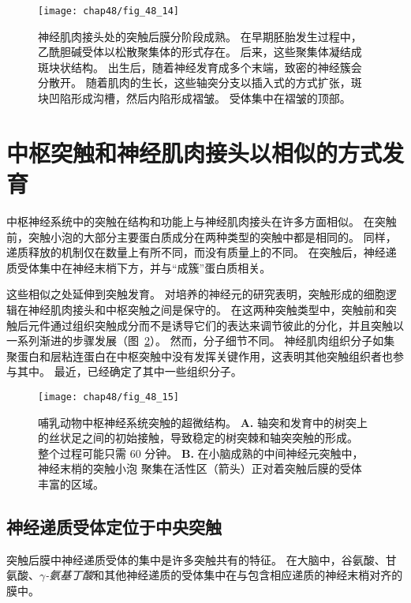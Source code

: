 \begin{figure}[htbp]
	\centering
	\texttt{[image: chap48/fig\_48\_14]}
	\caption{神经肌肉接头处的突触后膜分阶段成熟。
		在早期胚胎发生过程中，乙酰胆碱受体以松散聚集体的形式存在。
		后来，这些聚集体凝结成斑块状结构。
		出生后，随着神经发育成多个末端，致密的神经簇会分散开。
		随着肌肉的生长，这些轴突分支以插入式的方式扩张，斑块凹陷形成沟槽，然后内陷形成褶皱。
		受体集中在褶皱的顶部\cite{sanes2001induction}。}
	\label{fig:48_14}
\end{figure}



\section{中枢突触和神经肌肉接头以相似的方式发育}

中枢神经系统中的突触在结构和功能上与神经肌肉接头在许多方面相似。
在突触前，突触小泡的大部分主要蛋白质成分在两种类型的突触中都是相同的。
同样，递质释放的机制仅在数量上有所不同，而没有质量上的不同。
在突触后，神经递质受体集中在神经末梢下方，并与“成簇”蛋白质相关。


这些相似之处延伸到突触发育。
对培养的神经元的研究表明，突触形成的细胞逻辑在神经肌肉接头和中枢突触之间是保守的。
在这两种突触类型中，突触前和突触后元件通过组织突触成分而不是诱导它们的表达来调节彼此的分化，并且突触以一系列渐进的步骤发展（图~\ref{fig:48_15}）。
然而，分子细节不同。
神经肌肉组织分子如集聚蛋白和层粘连蛋白在中枢突触中没有发挥关键作用，这表明其他突触组织者也参与其中。
最近，已经确定了其中一些组织分子。


\begin{figure}[htbp]
	\centering
	\texttt{[image: chap48/fig\_48\_15]}
	\caption{哺乳动物中枢神经系统突触的超微结构。
		\textbf{A.} 轴突和发育中的树突上的丝状足之间的初始接触，导致稳定的树突棘和轴突突触的形成。
		整个过程可能只需 60 分钟。
		\textbf{B.} 在小脑成熟的中间神经元突触中，神经末梢的突触小泡 聚集在活性区（箭头）正对着突触后膜的受体丰富的区域。}
	\label{fig:48_15}
\end{figure}



\subsection{神经递质受体定位于中央突触}

突触后膜中神经递质受体的集中是许多突触共有的特征。
在大脑中，谷氨酸、甘氨酸、\textit{$ \gamma $-氨基丁酸}和其他神经递质的受体集中在与包含相应递质的神经末梢对齐的膜中。




